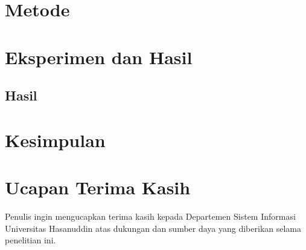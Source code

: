 \documentclass[conference]{IEEEtran}
\begin{document}
\section{Metode}
\section{Eksperimen dan Hasil}

\subsection{Hasil}

\section{Kesimpulan}
\label{sec:conclusion}


\section*{Ucapan Terima Kasih}
Penulis ingin mengucapkan terima kasih kepada Departemen Sistem Informasi Universitas Hasanuddin atas dukungan dan sumber daya yang diberikan selama penelitian ini.
\end{document}
